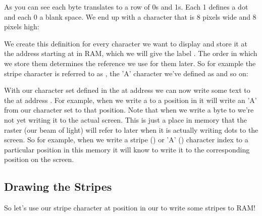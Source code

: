 As you can see each byte translates to a row of 0s and 1s. Each 1 defines a dot and each 0 a blank space. We end up
with a character that is 8 pixels wide and 8 pixels high:



We create this definition for every character we want to display and store it at the address starting at 
in RAM, which we will give the label . The order in which we store them determines the reference we use for them later. So for example the stripe
character is referred to as , the 'A' character we've defined as  and so on:



With our character set defined in the  at address  we can now write some text to
the  at address . For example, when we write a  to a position in 
it will write an 'A' from our character set to that position. Note that when we write a byte to 
we're not yet writing it to the actual screen. This is just a
place in memory that the raster (our beam of light) will refer to later when it
is actually writing dots to the screen. So for example, when we write a stripe () or 'A' ()
character index to a particular position in this 
memory it will know to write it to the corresponding position on the
screen. 

\subsection{Drawing the Stripes}
So let's use our stripe character at position  in our  to  write some stripes to RAM!


